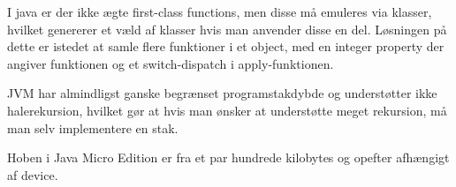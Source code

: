 I java er der ikke ægte first-class functions, men disse må emuleres via klasser, hvilket genererer et væld af klasser hvis man anvender disse en del. Løsningen på dette er istedet at samle flere funktioner i et object, med en integer property der angiver funktionen og et switch-dispatch i apply-funktionen.

JVM har almindligst ganske begrænset programstakdybde og understøtter ikke halerekursion, hvilket gør at hvis man ønsker at understøtte meget rekursion, må man selv implementere en stak.

Hoben i Java Micro Edition er fra et par hundrede kilobytes og opefter afhængigt af device.


